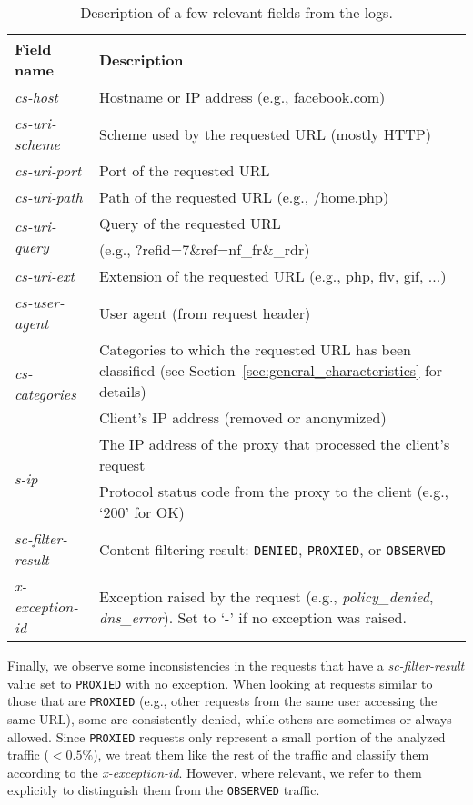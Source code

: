 \documentclass{sig-alternate-2013}
\newcommand{\policydenied}{\emph{policy\_denied}\xspace}
\begin{document}
\begin{table}[t]
\small
\centering
\begin{tabular}{|l|p{6cm}|} 	
	\hline
 {\bf Field name} &  {\bf Description} \\
 \hline
   {\em cs-host} &  Hostname or IP address (e.g., \url{facebook.com})\\  \hline
   {\em cs-uri-scheme} & Scheme used by the requested URL (mostly HTTP) \\ \hline
   {\em cs-uri-port} & Port of the requested URL  \\ \hline
   {\em cs-uri-path} & Path of the requested URL (e.g., /home.php) \\ \hline
   \multirow{2}{*}{\em cs-uri-query} & Query of the requested URL  \\
    & (e.g., ?refid=7\&ref=nf\_fr\&\_rdr) \\  \hline
   {\em cs-uri-ext} & Extension of the requested URL (e.g., php, flv, gif, ...) \\  \hline
   {\em cs-user-agent} & User agent (from request header)\\ \hline
      \multirow{2}{*}{\em cs-categories} & Categories to which the requested URL has been classified (see Section~\ref{sec:general_characteristics} for details)\\ \hline
    {\em c-ip} & Client's IP address (removed or anonymized)\\ \hline
   \multirow{2}{*}{\em s-ip} & The IP address of the proxy that processed the client's request \\ \hline
   \multirow{2}{*}{\em sc-status} & Protocol status code from the proxy to the client (e.g., `200' for OK) \\ \hline
   {\em sc-filter-result} & Content filtering result: \texttt{DENIED}, \texttt{PROXIED}, or \texttt{OBSERVED}  \\ \hline
   \multirow{2}{*}{\em x-exception-id} & Exception raised by the request (e.g., \policydenied, \emph{dns\_error}). Set to `-' if no exception was raised. \\
   \hline
\end{tabular}
\caption{Description of a few relevant fields from the logs.}\label{tab:field_description}
\end{table} 

Finally, we observe some inconsistencies in the requests that have a \emph{sc-filter-result} value set to \texttt{PROXIED} with no exception. 
When looking at requests similar to those that are \texttt{PROXIED} (e.g., other requests from the same user accessing the same URL), some are consistently denied, while others are sometimes or always allowed.
Since \texttt{PROXIED} requests only represent a small portion of the analyzed traffic ($<0.5\%$), we treat them like the rest of the traffic and classify them according to the \emph{x-exception-id}. However, where relevant, we refer to them explicitly to distinguish them from the \texttt{OBSERVED} traffic.
\end{document}
